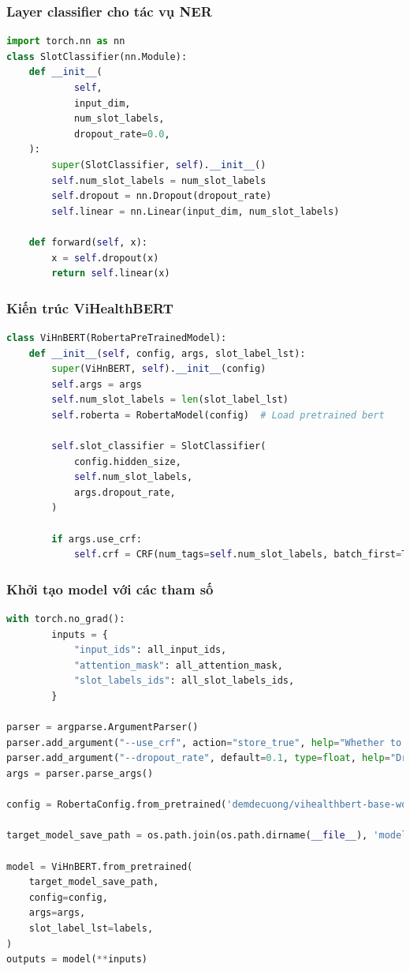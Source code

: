 \subsubsection{Layer classifier cho tác vụ NER}
\begin{lstlisting}[language=Python]
import torch.nn as nn
class SlotClassifier(nn.Module):
    def __init__(
            self,
            input_dim,
            num_slot_labels,
            dropout_rate=0.0,
    ):
        super(SlotClassifier, self).__init__()
        self.num_slot_labels = num_slot_labels
        self.dropout = nn.Dropout(dropout_rate)
        self.linear = nn.Linear(input_dim, num_slot_labels)

    def forward(self, x):
        x = self.dropout(x)
        return self.linear(x)
\end{lstlisting}

\subsubsection{Kiến trúc ViHealthBERT}
\begin{lstlisting}[language=Python]
class ViHnBERT(RobertaPreTrainedModel):
    def __init__(self, config, args, slot_label_lst):
        super(ViHnBERT, self).__init__(config)
        self.args = args
        self.num_slot_labels = len(slot_label_lst)
        self.roberta = RobertaModel(config)  # Load pretrained bert

        self.slot_classifier = SlotClassifier(
            config.hidden_size,
            self.num_slot_labels,
            args.dropout_rate,
        )

        if args.use_crf:
            self.crf = CRF(num_tags=self.num_slot_labels, batch_first=True)
\end{lstlisting}

\subsubsection{Khởi tạo model với các tham số }
\begin{lstlisting}[language=Python]
with torch.no_grad():
        inputs = {
            "input_ids": all_input_ids,
            "attention_mask": all_attention_mask,
            "slot_labels_ids": all_slot_labels_ids,
        }

parser = argparse.ArgumentParser()
parser.add_argument("--use_crf", action="store_true", help="Whether to use CRF")
parser.add_argument("--dropout_rate", default=0.1, type=float, help="Dropout for fully-connected layers")
args = parser.parse_args()

config = RobertaConfig.from_pretrained('demdecuong/vihealthbert-base-word', finetuning_task='')

target_model_save_path = os.path.join(os.path.dirname(__file__), 'model-save')

model = ViHnBERT.from_pretrained(
    target_model_save_path,
    config=config,
    args=args,
    slot_label_lst=labels,
)
outputs = model(**inputs)
\end{lstlisting}

